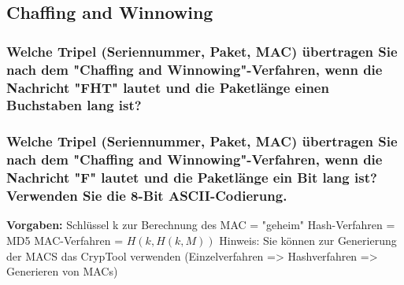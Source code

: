 \subsection{Chaffing and Winnowing}
\subsubsection{Welche Tripel (Seriennummer, Paket, MAC) übertragen Sie nach dem
"Chaffing and Winnowing"-Verfahren, wenn die Nachricht "FHT" lautet und die
Paketlänge einen Buchstaben lang ist?}
\subsubsection{Welche Tripel (Seriennummer, Paket, MAC) übertragen Sie nach dem
"Chaffing and Winnowing"-Verfahren, wenn die Nachricht "F" lautet und die
Paketlänge ein Bit lang ist? Verwenden Sie die 8-Bit ASCII-Codierung.}

\textbf{Vorgaben:}
Schlüssel k zur Berechnung des MAC = "geheim"
Hash-Verfahren = MD5
MAC-Verfahren = $H(k, H(k, M))$
Hinweis: Sie können zur Generierung der MACS das CrypTool verwenden
(Einzelverfahren => Hashverfahren => Generieren von MACs)
